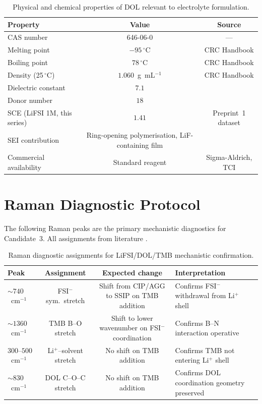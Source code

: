 \documentclass[11pt]{article}
\theoremstyle{plain}
\theoremstyle{definition}
\theoremstyle{remark}
\begin{document}
\begin{table}[h!]
\centering
\caption{Physical and chemical properties of DOL relevant to electrolyte
formulation.}
\label{tab:DOL_props}
\begin{tabular}{lcc}
\toprule
Property & Value & Source \\
\midrule
CAS number & 646-06-0 & --- \\
Melting point & $-95\,^\circ$C & CRC Handbook \cite{CRC2024} \\
Boiling point & $78\,^\circ$C & CRC Handbook \cite{CRC2024} \\
Density (25\,$^\circ$C) & $1.060$~g~mL$^{-1}$ &
  CRC Handbook \cite{CRC2024} \\
Dielectric constant & $7.1$ & \cite{Reichardt2011} \\
Donor number & $18$ & \cite{Gutmann1976} \\
SCE (LiFSI 1M, this series) & $1.41$ & Preprint~1 dataset \\
SEI contribution & Ring-opening polymerisation, LiF-containing
  film & \cite{Holoubek2021} \\
Commercial availability & Standard reagent & Sigma-Aldrich, TCI \\
\bottomrule
\end{tabular}
\end{table}

\section{Raman Diagnostic Protocol}
\label{app:raman}

The following Raman peaks are the primary mechanistic diagnostics for
Candidate~3.  All assignments from literature \cite{Wan2021,Chen2022}.

\begin{table}[h!]
\centering
\caption{Raman diagnostic assignments for LiFSI/DOL/TMB mechanistic
confirmation.}
\label{tab:raman}
\small
\begin{tabular}{lccp{5.5cm}}
\toprule
Peak & Assignment & Expected change & Interpretation \\
\midrule
$\sim\!740$~cm$^{-1}$ & FSI$^-$ sym.\ stretch &
  Shift from CIP/AGG to SSIP on TMB addition &
  Confirms FSI$^-$ withdrawal from Li$^+$ shell \\[6pt]
$\sim\!1360$~cm$^{-1}$ & TMB B--O stretch &
  Shift to lower wavenumber on FSI$^-$ coordination &
  Confirms B--N interaction operative \\[6pt]
$300$--$500$~cm$^{-1}$ & Li$^+$--solvent stretch &
  No shift on TMB addition &
  Confirms TMB not entering Li$^+$ shell \\[6pt]
$\sim\!830$~cm$^{-1}$ & DOL C--O--C stretch &
  No shift on TMB addition &
  Confirms DOL coordination geometry preserved \\
\bottomrule
\end{tabular}
\end{table}
\end{document}
